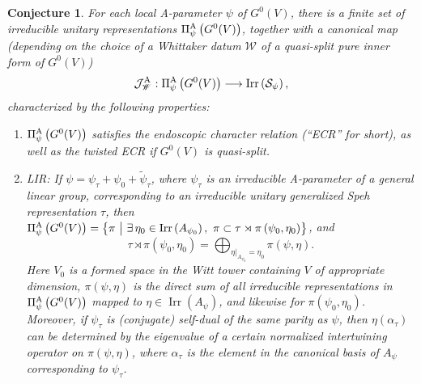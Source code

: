 \documentclass[11pt,letterpaper]{amsart}
\theoremstyle{plain}
\newcounter{theorem}[section]
\numberwithin{theorem}{section}
\numberwithin{equation}{subsection}
\newtheorem{Conj}[theorem]{Conjecture}
\theoremstyle{remark}
\newcommand{\Irr}{\operatorname{Irr}}
\def\calJ{\mathcal{J}}
\def\calS{\mathcal{S}}
\def\lra{\longrightarrow}
\def\AP{\Pi^{\rm A}} %
\begin{document}
\begin{Conj}\label{Conj:APacketsNProperties}
For each local A-parameter $\psi$ of $G^0(V)$, there is a finite set of irreducible unitary representations $\AP_\psi\left(G^0(V)\right)$, together with a canonical map (depending on the choice of a Whittaker datum $\mathscr{W}$ of a quasi-split pure inner form of $G^0(V)$)
\[
    \calJ^{\rm A}_{\mathscr{W}}: \AP_\psi\left(G^0(V)\right) \lra \Irr\left(\calS_\psi\right),
\]
characterized by the following properties:

\begin{enumerate}
    \item $\AP_\psi\left(G^0(V)\right)$ satisfies the endoscopic character relation (``ECR'' for short), as well as the twisted ECR if $G^0(V)$ is quasi-split.

    \vskip 5pt

    \item LIR: If $\psi = \psi_\tau + \psi_0 + \widetilde{\psi}_\tau$, where $\psi_\tau$ is an irreducible A-parameter of a general linear group, corresponding to an irreducible unitary generalized Speh representation $\tau$, then $\AP_\psi\left(G^0(V)\right) = \left\{\pi~\big|~\exists\,\eta_0\in\Irr\left(A_{\psi_0}\right),~\pi\subset\tau\rtimes\pi\left(\psi_0,\eta_0\right)\right\}$, and
    \[
        \tau\rtimes\pi\left(\psi_0,\eta_0\right) = \bigoplus_{\eta|_{A_{\psi_0}}=\eta_0} \pi\left(\psi,\eta\right).
    \]
    Here $V_0$ is a formed space in the Witt tower containing $V$ of appropriate dimension, $\pi\left(\psi,\eta\right)$ is the direct sum of all irreducible representations in $\AP_\psi\left(G^0(V)\right)$ mapped to $\eta\in\Irr\left(A_\psi\right)$, and likewise for $\pi\left(\psi_0,\eta_0\right)$. 
    Moreover, if $\psi_\tau$ is (conjugate) self-dual of the same parity as $\psi$, then $\eta(\alpha_\tau)$ can be determined by the eigenvalue of a certain normalized intertwining operator on $\pi\left(\psi,\eta\right)$, where $\alpha_\tau$ is the element in the canonical basis of $A_\psi$ corresponding to $\psi_\tau$.

    \vskip 5pt


\end{enumerate}
\end{Conj}
\end{document}
